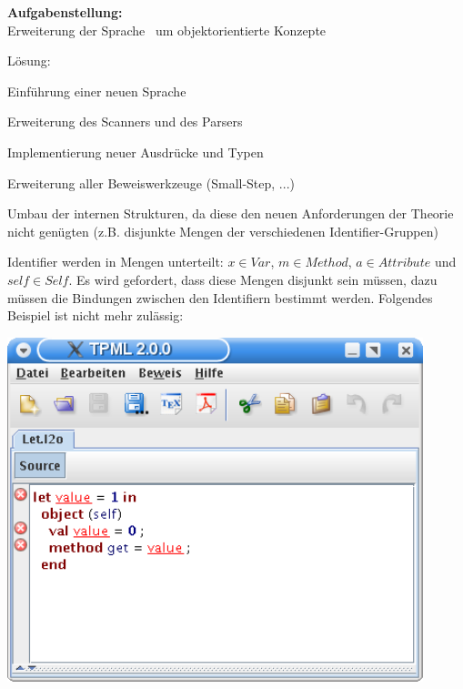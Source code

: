 {
  \textbf{Aufgabenstellung:}\\[2mm]
  Erweiterung der Sprache \LTWO\ um objektorientierte Konzepte

  {
    \begin{itemgroup}{Lösung:}
      \item Einführung einer neuen Sprache \LTWOO
      \item Erweiterung des Scanners und des Parsers
      \item Implementierung neuer Ausdrücke und Typen
      \item Erweiterung aller Beweiswerkzeuge (Small-Step, ...)
      \item Umbau der internen Strukturen, da diese den neuen Anforderungen der
            Theorie nicht genügten (z.B. disjunkte Mengen der verschiedenen Identifier-Gruppen)
    \end{itemgroup}
  }
}

{
  Identifier werden in Mengen unterteilt: $x \in Var$, $m \in Method$, $a \in Attribute$ 
  und $self \in Self$. Es wird gefordert, dass diese Mengen disjunkt sein müssen,
  dazu müssen die Bindungen zwischen den Identifiern bestimmt werden. Folgendes
  Beispiel ist nicht mehr zulässig:

  \begin{center}
    \includegraphics[height=10cm]{images/object_disjunction.png}
  \end{center}
}


